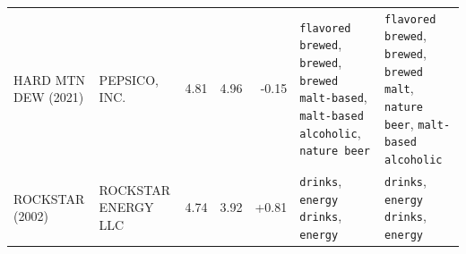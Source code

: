 \begin{tabular}{>{\raggedright\arraybackslash}p{3.4cm}>{\raggedright\arraybackslash}p{3.8cm}rrr >{\raggedright\arraybackslash}p{6.0cm} >{\raggedright\arraybackslash}p{6.0cm}}
HARD MTN DEW (2021) & PEPSICO, INC. & 4.81 & 4.96 & -0.15 & \texttt{flavored brewed}, \texttt{brewed}, \texttt{brewed malt-based}, \texttt{malt-based alcoholic}, \texttt{nature beer} & \texttt{flavored brewed}, \texttt{brewed}, \texttt{brewed malt}, \texttt{nature beer}, \texttt{malt-based alcoholic} \\
ROCKSTAR (2002) & ROCKSTAR ENERGY LLC & 4.74 & 3.92 & +0.81 & \texttt{drinks}, \texttt{energy drinks}, \texttt{energy} & \texttt{drinks}, \texttt{energy drinks}, \texttt{energy} \\
\bottomrule
\end{tabular}
